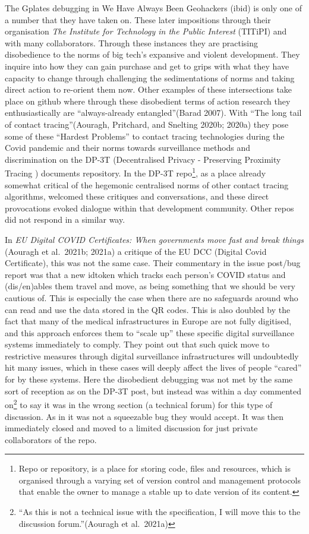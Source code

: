The Gplates debugging in We Have Always Been Geohackers (ibid) is only
one of a number that they have taken on. These later impositions through
their organisation \emph{The Institute for Technology in the Public
Interest} (TITiPI) and with many collaborators. Through these instances
they are practising disobedience to the norms of big tech's expansive
and violent development. They inquire into how they can gain purchase
and get to grips with what they have capacity to change through
challenging the sedimentations of norms and taking direct action to
re-orient them now. Other examples of these intersections take place on
github where through these disobedient terms of action research they
enthusiastically are ``always-already entangled''(Barad 2007). With
``The long tail of contact tracing''(Aouragh, Pritchard, and Snelting
2020b; 2020a) they pose some of these ``Hardest Problems'' to contact
tracing technologies during the Covid pandemic and their norms towards
surveillance methods and discrimination on the DP-3T (Decentralised
Privacy - Preserving Proximity Tracing ) documents repository. In the
DP-3T repo\footnote{Repo or repository, is a place for storing code,
  files and resources, which is organised through a varying set of
  version control and management protocols that enable the owner to
  manage a stable up to date version of its content.}, as a place
already somewhat critical of the hegemonic centralised norms of other
contact tracing algorithms, welcomed these critiques and conversations,
and these direct provocations evoked dialogue within that development
community. Other repos did not respond in a similar way.

In \emph{EU Digital COVID Certificates: When governments move fast and
break things} (Aouragh et al.~2021b; 2021a) a critique of the EU DCC
(Digital Covid Certificate), this was not the same case. Their
commentary in the issue post/bug report was that a new idtoken which
tracks each person's COVID status and (dis/en)ables them travel and
move, as being something that we should be very cautious of. This is
especially the case when there are no safeguards around who can read and
use the data stored in the QR codes. This is also doubled by the fact
that many of the medical infrastructures in Europe are not fully
digitised, and this approach enforces them to ``scale up'' these
specific digital surveillance systems immediately to comply. They point
out that such quick move to restrictive measures through digital
surveillance infrastructures will undoubtedly hit many issues, which in
these cases will deeply affect the lives of people ``cared'' for by
these systems. Here the disobedient debugging was not met by the same
sort of reception as on the DP-3T post, but instead was within a day
commented on\footnote{``As this is not a technical issue with the
  specification, I will move this to the discussion forum.''(Aouragh et
  al.~2021a)} to say it was in the wrong section (a technical forum) for
this type of discussion. As in it was not a squeezable bug they would
accept. It was then immediately closed and moved to a limited discussion
for just private collaborators of the repo.

